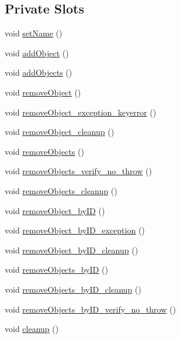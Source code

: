 \subsection*{Private Slots}
\begin{DoxyCompactItemize}
\item 
void \hyperlink{classdefault__playerbase_aeca851e45b82a35e314594e9fa895447}{set\-Name} ()
\item 
void \hyperlink{classdefault__playerbase_ad1f183df28852e74c155f49db5b17702}{add\-Object} ()
\item 
void \hyperlink{classdefault__playerbase_ab4a6152ea15d7fba3a305cde06563250}{add\-Objects} ()
\item 
void \hyperlink{classdefault__playerbase_aee868856c989eaba1fba591024921711}{remove\-Object} ()
\item 
void \hyperlink{classdefault__playerbase_ad8ee69e49d61514bbfb6441165045288}{remove\-Object\-\_\-exception\-\_\-keyerror} ()
\item 
void \hyperlink{classdefault__playerbase_a0d762ce7d0fcfbbbbe7da4764832d3d7}{remove\-Object\-\_\-cleanup} ()
\item 
void \hyperlink{classdefault__playerbase_ab0435d999f7f24a39b13a753a28b57e5}{remove\-Objects} ()
\item 
void \hyperlink{classdefault__playerbase_ac76a8293414dee2a11baa4059aabd707}{remove\-Objects\-\_\-verify\-\_\-no\-\_\-throw} ()
\item 
void \hyperlink{classdefault__playerbase_afcc8ecbf9f084799b07812485165cca3}{remove\-Objects\-\_\-cleanup} ()
\item 
void \hyperlink{classdefault__playerbase_a1b1dac346d1ad3f38f09c956763ebda3}{remove\-Object\-\_\-by\-I\-D} ()
\item 
void \hyperlink{classdefault__playerbase_a98744fc4c97cb7d468d432baf99da59a}{remove\-Object\-\_\-by\-I\-D\-\_\-exception} ()
\item 
void \hyperlink{classdefault__playerbase_aae868dda496dafc8c28267c08c03a9d6}{remove\-Object\-\_\-by\-I\-D\-\_\-cleanup} ()
\item 
void \hyperlink{classdefault__playerbase_a87b8f296fefa5731303dc4e1c9a1f3c9}{remove\-Objects\-\_\-by\-I\-D} ()
\item 
void \hyperlink{classdefault__playerbase_a4b6b6efae3c2c4fc9d27ac382f25cd61}{remove\-Objects\-\_\-by\-I\-D\-\_\-cleanup} ()
\item 
void \hyperlink{classdefault__playerbase_aed32848900592ff043e0e9583e59f27f}{remove\-Objects\-\_\-by\-I\-D\-\_\-verify\-\_\-no\-\_\-throw} ()
\item 
void \hyperlink{classdefault__playerbase_a8a5165112d5927d48e7f213446bb63a0}{cleanup} ()
\end{DoxyCompactItemize}
